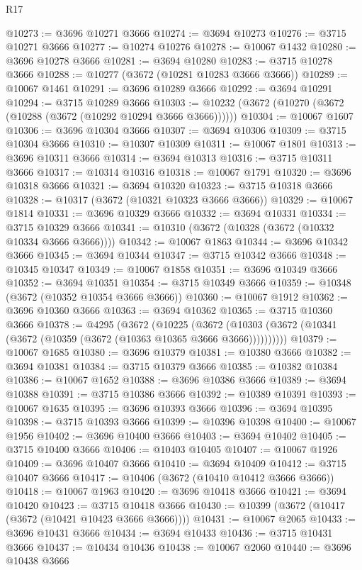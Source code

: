 \begin{lexlean}{R17}
\begin{coremodule}
@10273 := @3696 @10271 @3666
@10274 := @3694 @10273
@10276 := @3715 @10271 @3666
@10277 := @10274 @10276
@10278 := @10067 @1432
@10280 := @3696 @10278 @3666
@10281 := @3694 @10280
@10283 := @3715 @10278 @3666
@10288 := @10277 (@3672 (@10281 @10283 @3666 @3666))
@10289 := @10067 @1461
@10291 := @3696 @10289 @3666
@10292 := @3694 @10291
@10294 := @3715 @10289 @3666
@10303 := @10232 (@3672 (@10270 (@3672 (@10288 (@3672 (@10292 @10294 @3666 @3666))))))
@10304 := @10067 @1607
@10306 := @3696 @10304 @3666
@10307 := @3694 @10306
@10309 := @3715 @10304 @3666
@10310 := @10307 @10309
@10311 := @10067 @1801
@10313 := @3696 @10311 @3666
@10314 := @3694 @10313
@10316 := @3715 @10311 @3666
@10317 := @10314 @10316
@10318 := @10067 @1791
@10320 := @3696 @10318 @3666
@10321 := @3694 @10320
@10323 := @3715 @10318 @3666
@10328 := @10317 (@3672 (@10321 @10323 @3666 @3666))
@10329 := @10067 @1814
@10331 := @3696 @10329 @3666
@10332 := @3694 @10331
@10334 := @3715 @10329 @3666
@10341 := @10310 (@3672 (@10328 (@3672 (@10332 @10334 @3666 @3666))))
@10342 := @10067 @1863
@10344 := @3696 @10342 @3666
@10345 := @3694 @10344
@10347 := @3715 @10342 @3666
@10348 := @10345 @10347
@10349 := @10067 @1858
@10351 := @3696 @10349 @3666
@10352 := @3694 @10351
@10354 := @3715 @10349 @3666
@10359 := @10348 (@3672 (@10352 @10354 @3666 @3666))
@10360 := @10067 @1912
@10362 := @3696 @10360 @3666
@10363 := @3694 @10362
@10365 := @3715 @10360 @3666
@10378 := @4295
    (@3672
      (@10225
        (@3672 (@10303 (@3672 (@10341 (@3672 (@10359 (@3672 (@10363 @10365 @3666 @3666))))))))))
@10379 := @10067 @1685
@10380 := @3696 @10379
@10381 := @10380 @3666
@10382 := @3694 @10381
@10384 := @3715 @10379 @3666
@10385 := @10382 @10384
@10386 := @10067 @1652
@10388 := @3696 @10386 @3666
@10389 := @3694 @10388
@10391 := @3715 @10386 @3666
@10392 := @10389 @10391
@10393 := @10067 @1635
@10395 := @3696 @10393 @3666
@10396 := @3694 @10395
@10398 := @3715 @10393 @3666
@10399 := @10396 @10398
@10400 := @10067 @1956
@10402 := @3696 @10400 @3666
@10403 := @3694 @10402
@10405 := @3715 @10400 @3666
@10406 := @10403 @10405
@10407 := @10067 @1926
@10409 := @3696 @10407 @3666
@10410 := @3694 @10409
@10412 := @3715 @10407 @3666
@10417 := @10406 (@3672 (@10410 @10412 @3666 @3666))
@10418 := @10067 @1963
@10420 := @3696 @10418 @3666
@10421 := @3694 @10420
@10423 := @3715 @10418 @3666
@10430 := @10399 (@3672 (@10417 (@3672 (@10421 @10423 @3666 @3666))))
@10431 := @10067 @2065
@10433 := @3696 @10431 @3666
@10434 := @3694 @10433
@10436 := @3715 @10431 @3666
@10437 := @10434 @10436
@10438 := @10067 @2060
@10440 := @3696 @10438 @3666

\end{coremodule}
\end{lexlean}
